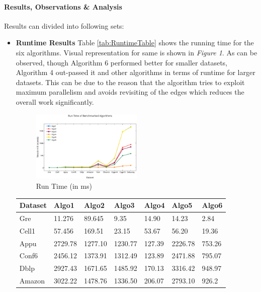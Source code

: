 \paragraph{Results, Observations \& Analysis}
Results can divided into following sets:
\begin{itemize}
\item
\textbf{Runtime Results}
Table \ref{tab:RuntimeTable} shows the running time for the six
algorithms.  Visual representation for same is shown in \emph{Figure
1}.  As can be observed, though Algorithm 6 performed better for
smaller datasets, Algorithm 4 out-passed it and other algorithms in
terms of runtime for larger datasets.  This can be due to the reason
that the algorithm tries to exploit maximum parallelism and avoids
revisiting of the edges which reduces the overall work significantly.
\begin{figure}[t]
    \centering
    \includegraphics[width=0.5\textwidth]{figures/RunTimeofBenchmarkedAlgorithms.eps}
    \caption{Run Time (in ms)}
    \label{fig:Run Time}
\end{figure}
\begin{table}[th]
\begin{center}
    \begin{tabular}{| l | l | l | l | l | l | l |}
    \hline
	Dataset & Algo1 & Algo2 & Algo3 & Algo4 & Algo5 & Algo6\\ \hline
    \hline
	Gre & 11.276 & 89.645 & 9.35 & 14.90 & 14.23 & \cellcolor{blue!25} 2.84\\ \hline
	Cell1 & 57.456 & 169.51 & 23.15 & 53.67 & 56.20 & \cellcolor{blue!25} 19.36\\ \hline
	Appu & 2729.78 & 1277.10 & 1230.77 & \cellcolor{blue!25} 127.39 & 2226.78 & 753.26\\ \hline
	Conf6 & 2456.12 & 1373.91 & 1312.49 & \cellcolor{blue!25} 123.89 & 2471.88 & 795.07\\ \hline
	Dblp & 2927.43 & 1671.65 & 1485.92 & \cellcolor{blue!25} 170.13 & 3316.42 & 948.97\\ \hline
	Amazon & 3022.22 & 1478.76 & 1336.50 & \cellcolor{blue!25} 206.07 & 2793.10 & 926.2\\ \hline

\end{tabular}
\end{center}
\end{table}
\end{itemize}
